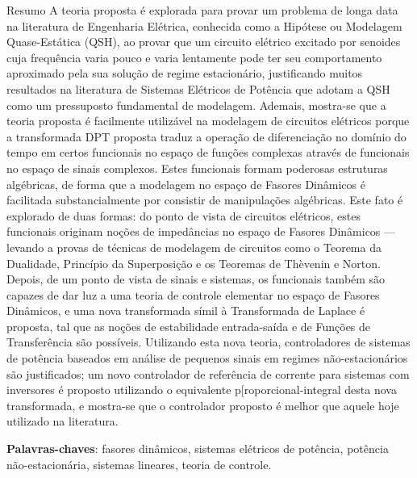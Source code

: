\documentclass{apaThesis}
\begin{document}
\begin{newabstract}{Resumo}
	A teoria proposta é explorada para provar um problema de longa data na literatura de Engenharia Elétrica, conhecida como a Hipótese ou Modelagem Quase-Estática (QSH), ao provar que um circuito elétrico excitado por senoides cuja frequência varia pouco e varia lentamente pode ter seu comportamento aproximado pela sua solução de regime estacionário, justificando muitos resultados na literatura de Sistemas Elétricos de Potência que adotam a QSH como um pressuposto fundamental de modelagem. Ademais, mostra-se que a teoria proposta é facilmente utilizável na modelagem de circuitos elétricos porque a transformada DPT proposta traduz a operação de diferenciação no domínio do tempo em certos funcionais no espaço de funções complexas através de funcionais no espaço de sinais complexos. Estes funcionais formam poderosas estruturas algébricas, de forma que a modelagem no espaço de Fasores Dinâmicos é facilitada substancialmente por consistir de manipulações algébricas. Este fato é explorado de duas formas: do ponto de vista de circuitos elétricos, estes funcionais originam noções de impedâncias no espaço de Fasores Dinâmicos — levando a provas de técnicas de modelagem de circuitos como o Teorema da Dualidade, Princípio da Superposição e os Teoremas de Thèvenin e Norton. Depois, de um ponto de vista de sinais e sistemas, os funcionais também são capazes de dar luz a uma teoria de controle elementar no espaço de Fasores Dinâmicos, e uma nova transformada símil à Transformada de Laplace é proposta, tal que as noções de estabilidade entrada-saída e de Funções de Transferência são possíveis. Utilizando esta nova teoria, controladores de sistemas de potência baseados em análise de pequenos sinais em regimes não-estacionários são justificados; um novo controlador de referência de corrente para sistemas com inversores é proposto utilizando o equivalente p[roporcional-integral desta nova transformada, e mostra-se que o controlador proposto é melhor que aquele hoje utilizado na literatura.

\noindent
\textbf{Palavras-chaves}: fasores dinâmicos, sistemas elétricos de potência, potência não-estacionária, sistemas lineares, teoria de controle.
\end{newabstract}

\end{document}
